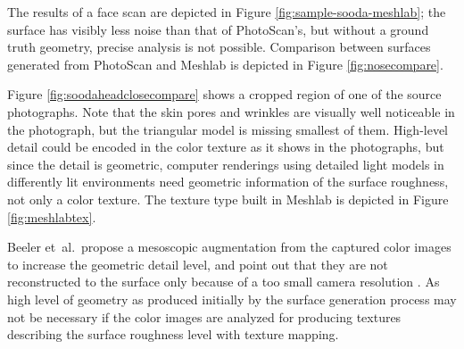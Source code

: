 The results of a face scan are depicted in Figure \ref{fig:sample-sooda-meshlab}; the surface has visibly less noise than that of PhotoScan's, but without a ground truth geometry, precise analysis is not possible.
Comparison between surfaces generated from PhotoScan and Meshlab is depicted in Figure \ref{fig:nosecompare}.

Figure \ref{fig:soodaheadclosecompare} shows a cropped region of one of the source photographs.
Note that the skin pores and wrinkles are visually well noticeable in the photograph, but the triangular model is missing smallest of them.
High-level detail could be encoded in the color texture as it shows in the photographs, but since the detail is geometric, computer renderings using detailed light models in differently lit environments need geometric information of the surface roughness, not only a color texture.
The texture type built in Meshlab is depicted in Figure \ref{fig:meshlabtex}.

Beeler et~al.\ propose a mesoscopic augmentation from the captured color images to increase the geometric detail level, and point out that they are not reconstructed to the surface only because of a too small camera resolution \cite{beeler2010high}.
As high level of geometry as produced initially by the surface generation process may not be necessary if the color images are analyzed for producing textures describing the surface roughness level with texture mapping.



